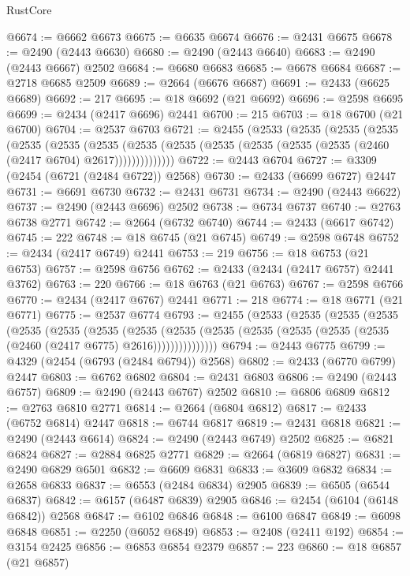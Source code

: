 \begin{lexlean}{RustCore}
\begin{coremodule}
@6674 := @6662 @6673
@6675 := @6635 @6674
@6676 := @2431 @6675
@6678 := @2490 (@2443 @6630)
@6680 := @2490 (@2443 @6640)
@6683 := @2490 (@2443 @6667) @2502
@6684 := @6680 @6683
@6685 := @6678 @6684
@6687 := @2718 @6685 @2509
@6689 := @2664 (@6676 @6687)
@6691 := @2433 (@6625 @6689)
@6692 := 217
@6695 := @18 @6692 (@21 @6692)
@6696 := @2598 @6695
@6699 := @2434 (@2417 @6696) @2441
@6700 := 215
@6703 := @18 @6700 (@21 @6700)
@6704 := @2537 @6703
@6721 := @2455
    (@2533
      (@2535
        (@2535
          (@2535
            (@2535
              (@2535
                (@2535
                  (@2535 (@2535 (@2535 (@2535 (@2535 (@2535 (@2460 (@2417 @6704) @2617))))))))))))))
@6722 := @2443 @6704
@6727 := @3309 (@2454 (@6721 (@2484 @6722)) @2568)
@6730 := @2433 (@6699 @6727) @2447
@6731 := @6691 @6730
@6732 := @2431 @6731
@6734 := @2490 (@2443 @6622)
@6737 := @2490 (@2443 @6696) @2502
@6738 := @6734 @6737
@6740 := @2763 @6738 @2771
@6742 := @2664 (@6732 @6740)
@6744 := @2433 (@6617 @6742)
@6745 := 222
@6748 := @18 @6745 (@21 @6745)
@6749 := @2598 @6748
@6752 := @2434 (@2417 @6749) @2441
@6753 := 219
@6756 := @18 @6753 (@21 @6753)
@6757 := @2598 @6756
@6762 := @2433 (@2434 (@2417 @6757) @2441 @3762)
@6763 := 220
@6766 := @18 @6763 (@21 @6763)
@6767 := @2598 @6766
@6770 := @2434 (@2417 @6767) @2441
@6771 := 218
@6774 := @18 @6771 (@21 @6771)
@6775 := @2537 @6774
@6793 := @2455
    (@2533
      (@2535
        (@2535
          (@2535
            (@2535
              (@2535
                (@2535
                  (@2535
                    (@2535
                      (@2535 (@2535 (@2535 (@2535 (@2535 (@2460 (@2417 @6775) @2616)))))))))))))))
@6794 := @2443 @6775
@6799 := @4329 (@2454 (@6793 (@2484 @6794)) @2568)
@6802 := @2433 (@6770 @6799) @2447
@6803 := @6762 @6802
@6804 := @2431 @6803
@6806 := @2490 (@2443 @6757)
@6809 := @2490 (@2443 @6767) @2502
@6810 := @6806 @6809
@6812 := @2763 @6810 @2771
@6814 := @2664 (@6804 @6812)
@6817 := @2433 (@6752 @6814) @2447
@6818 := @6744 @6817
@6819 := @2431 @6818
@6821 := @2490 (@2443 @6614)
@6824 := @2490 (@2443 @6749) @2502
@6825 := @6821 @6824
@6827 := @2884 @6825 @2771
@6829 := @2664 (@6819 @6827)
@6831 := @2490 @6829 @6501
@6832 := @6609 @6831
@6833 := @3609 @6832
@6834 := @2658 @6833
@6837 := @6553 (@2484 @6834) @2905
@6839 := @6505 (@6544 @6837)
@6842 := @6157 (@6487 @6839) @2905
@6846 := @2454 (@6104 (@6148 @6842)) @2568
@6847 := @6102 @6846
@6848 := @6100 @6847
@6849 := @6098 @6848
@6851 := @2250 (@6052 @6849)
@6853 := @2408 (@2411 @192)
@6854 := @3154 @2425
@6856 := @6853 @6854 @2379
@6857 := 223
@6860 := @18 @6857 (@21 @6857)

\end{coremodule}
\end{lexlean}
